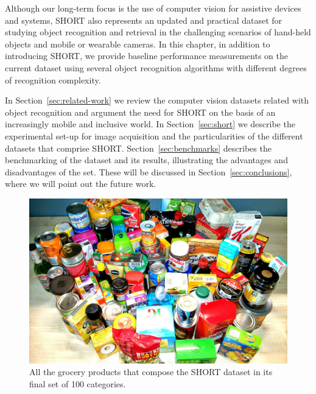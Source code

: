 Although our long-term focus is the use of computer vision for assistive devices and systems, SHORT also represents an updated and practical dataset for studying object recognition and retrieval in the challenging scenarios of hand-held objects and mobile or wearable cameras. In this chapter, in addition to introducing SHORT, we provide baseline performance measurements on the current dataset using several object recognition algorithms with different degrees of recognition complexity.

In Section~\ref{sec:related-work} we review the computer vision datasets related with object recognition and argument the need for SHORT on the basis of an increasingly mobile and inclusive world. In Section~\ref{sec:short} we describe the experimental set-up for image acquisition and the particularities of the different datasets that comprise SHORT. Section~\ref{sec:benchmarks} describes the benchmarking of the dataset and its results, illustrating the advantages and disadvantages of the set. These will be discussed in Section~\ref{sec:conclusions}, where we will point out the future work.

\begin{figure}[h!]
\centering
\includegraphics[width=\textwidth]{./gfx/Chapter03/SHORT_family_photo.jpg}
\caption{All the grocery products that compose the SHORT dataset in its final set of 100 categories.}
\label{fig:short-100-all}
\end{figure}


